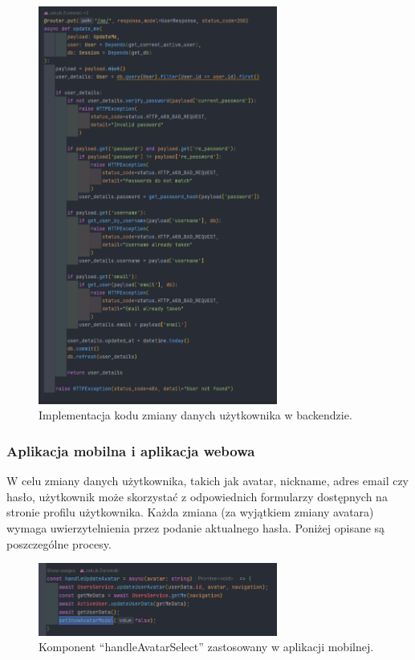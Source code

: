\begin{figure}[H]
    \centering
    \includegraphics[width=0.7\textwidth]{chapters/chapter_8/screens/edit_user_backend_2}
    \caption{Implementacja kodu zmiany danych użytkownika w backendzie.}
    \label{img:edit_user_backend_2}
\end{figure}

\subsubsection{Aplikacja mobilna i aplikacja webowa}
W celu zmiany danych użytkownika, takich jak avatar, nickname, adres email czy hasło, użytkownik może skorzystać z odpowiednich formularzy dostępnych na stronie profilu użytkownika. Każda zmiana (za wyjątkiem zmiany avatara) wymaga uwierzytelnienia przez podanie aktualnego hasła. Poniżej opisane są poszczególne procesy.

\begin{figure}[H]
    \centering
    \includegraphics[width=0.7\textwidth]{chapters/chapter_8/screens/edit_user_mobile}
    \caption{Komponent “handleAvatarSelect” zastosowany w aplikacji mobilnej.}
    \label{img:edit_user_mobile}
\end{figure}

